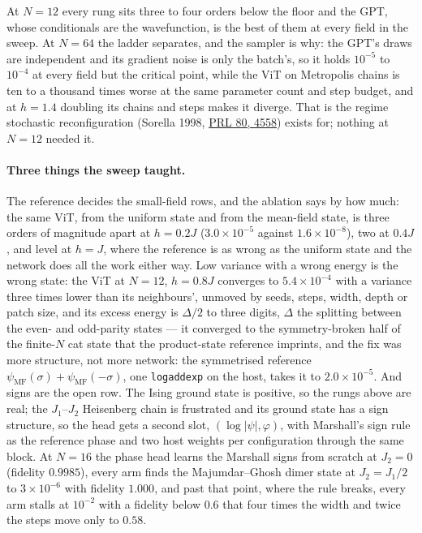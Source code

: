 \noindent At $N = 12$ every rung sits three to four orders below the floor
and the GPT, whose conditionals are the wavefunction, is the best of them
at every field in the sweep. At $N = 64$ the ladder separates, and the
sampler is why: the GPT's draws are independent and its gradient noise is
only the batch's, so it holds $10^{-5}$ to $10^{-4}$ at every field but the
critical point, while the ViT on Metropolis chains is ten to a thousand
times worse at the same parameter count and step budget, and at $h = 1.4$
doubling its chains and steps makes it diverge. That is the regime
stochastic reconfiguration (Sorella 1998,
\href{https://doi.org/10.1103/PhysRevLett.80.4558}{PRL 80, 4558}) exists
for; nothing at $N = 12$ needed it.

\paragraph{Three things the sweep taught.} The reference decides the
small-field rows, and the ablation says by how much: the same ViT, from
the uniform state and from the mean-field state, is three orders of
magnitude apart at $h = 0.2J$ ($3.0 \times 10^{-5}$ against
$1.6 \times 10^{-8}$), two at $0.4J$, and level at $h = J$, where the
reference is as wrong as the uniform state and the network does all the
work either way. Low variance with a wrong energy is the wrong state: the
ViT at $N = 12$, $h = 0.8J$ converges to $5.4 \times 10^{-4}$ with a
variance three times lower than its neighbours', unmoved by seeds, steps,
width, depth or patch size, and its excess energy is $\Delta/2$ to three
digits, $\Delta$ the splitting between the even- and odd-parity states ---
it converged to the symmetry-broken half of the finite-$N$ cat state that
the product-state reference imprints, and the fix was more structure, not
more network: the symmetrised reference $\psi_{\mathrm{MF}}(\sigma) +
\psi_{\mathrm{MF}}(-\sigma)$, one \texttt{logaddexp} on the host, takes it
to $2.0 \times 10^{-5}$. And signs are the open row. The Ising ground state
is positive, so the rungs above are real; the $J_1$--$J_2$ Heisenberg chain
is frustrated and its ground state has a sign structure, so the head gets a
second slot, $(\log|\psi|, \varphi)$, with Marshall's sign rule as the
reference phase and two host weights per configuration through the same
block. At $N = 16$ the phase head learns the Marshall signs from scratch at
$J_2 = 0$ (fidelity $0.9985$), every arm finds the Majumdar--Ghosh dimer
state at $J_2 = J_1/2$ to $3 \times 10^{-6}$ with fidelity $1.000$, and past
that point, where the rule breaks, every arm stalls at $10^{-2}$ with a
fidelity below $0.6$ that four times the width and twice the steps move
only to $0.58$.


